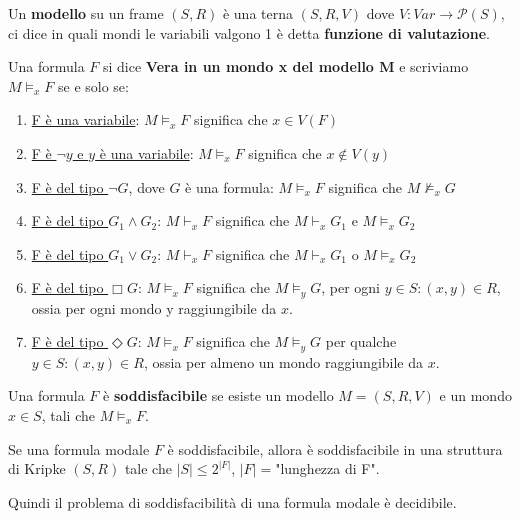 \documentclass[10pt,a4paper,twoside]{book}
\begin{document}
\begin{definition}[Modello]
    Un \textbf{modello} su un frame $(S,R)$ è una terna $(S,R,V)$ dove $V : Var \rightarrow \mathcal{P}(S) $, ci dice in quali mondi le variabili valgono 1 è detta \textbf{funzione di valutazione}.
\end{definition}
\begin{definition}
    Una formula $F$ si dice \textbf{Vera in un mondo x del modello M} e scriviamo $M \vDash_x F$ se e solo se:
    \begin{enumerate}
        \item \underline{F è una variabile}: $M \vDash_x F$ significa che $x \in V(F)$
        \item \underline{ F è $\neg y$ e $y$ è una variabile}: $M \vDash_x F$ significa che $x \notin V(y)$
        \item \underline{F è del tipo $\neg G$}, dove $G$ è una formula: $M \vDash_x F$ significa che $M \nvDash_x G$
        \item \underline{F è del tipo $G_1 \land G_2$}: $M \vdash_x F$ significa che $M \vdash_x G_1$ e $M \vDash_x G_2$
        \item \underline{F è del tipo $G_1 \lor G_2$}: $M \vdash_x F$ significa che $M \vdash_x G_1$ o $M \vDash_x G_2$
        \item \underline{F è del tipo $\Box G$}: $M \vDash_x F$ significa che $M \vDash_y G$, per ogni $y \in S : (x,y) \in R$, ossia per ogni mondo y raggiungibile da $x$.
        \item \underline{F è del tipo $\Diamond G$}: $M \vDash_x F$ significa che $M \vDash_y G$ per qualche $y \in S : (x,y) \in R$, ossia per almeno un mondo raggiungibile da $x$.
    \end{enumerate}
\end{definition}
\begin{definition}[Soddisfacibilità]
    Una formula $F$ è \textbf{soddisfacibile} se esiste un modello $M = (S, R, V)$ e un mondo $x \in S$, tali che $M \vDash_x F$.
\end{definition}
\begin{theorem}
    Se una formula modale $F$ è soddisfacibile, allora è soddisfacibile in una struttura di Kripke $(S,R)$ tale che $|S| \leq 2^{|F|}$, $|F| = $"lunghezza di F".

    Quindi il problema di soddisfacibilità di una formula modale è decidibile.
\end{theorem}
\newpage
\end{document}
